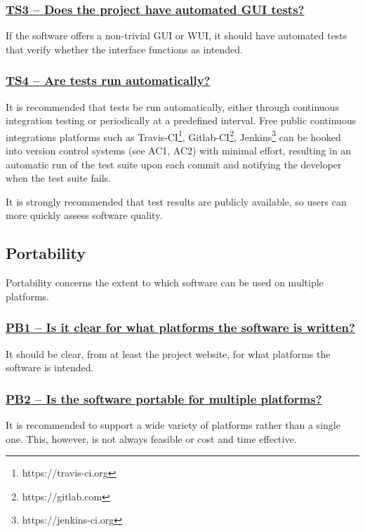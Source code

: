 \documentclass[a4paper,11pt]{article}
\newcommand{\criterion}[1]{\subsubsection*{\underline{#1}}}
\begin{document}
\newcommand{\tsThreeID}{TS3}
\newcommand{\tsThreeText}{Does the project have automated GUI tests?}
\criterion{\tsThreeID{ }--{ }\tsThreeText}\label{id:ts3} 

If the software offers a non-trivial GUI or WUI, it should have automated tests
that verify whether the interface functions as intended.

\newcommand{\tsFourID}{TS4}
\newcommand{\tsFourText}{Are tests run automatically?}
\criterion{\tsFourID{ }--{ }\tsFourText}\label{id:ts4} 

It is recommended that tests be run automatically, either through continuous
integration testing or periodically at a predefined interval. Free public
continuous integrations platforms such as
Travis-CI\footnote{https://travis-ci.org},
Gitlab-CI\footnote{https://gitlab.com},
Jenkins\footnote{https://jenkins-ci.org} can be hooked into version control
systems (see AC1, AC2) with minimal effort, resulting in an automatic run of the test suite
upon each commit and notifying the developer when the test suite fails.

It is strongly recommended that test results are publicly available, so users
can more quickly assess software quality.

\subsection{Portability}\label{sec:por}

Portability concerns the extent to which software can be used on multiple
platforms. 

\newcommand{\pbOneID}{PB1}
\newcommand{\pbOneText}{Is it clear for what platforms the software is written?}
\criterion{\pbOneID{ }--{ }\pbOneText}\label{id:pb1} 

It should be clear, from at least the project website, for what platforms the software
is intended.

\newcommand{\pbTwoID}{PB2}
\newcommand{\pbTwoText}{Is the software portable for multiple platforms?}
\criterion{\pbTwoID{ }--{ }\pbTwoText}\label{id:pb2} 

It is recommended to support a wide variety of platforms rather than a single
one. This, however, is not always feasible or cost and time effective.
\end{document}
